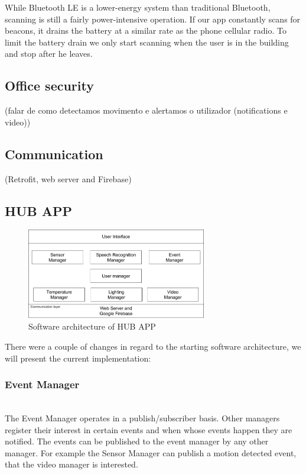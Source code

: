 While Bluetooth LE is a lower-energy system than traditional Bluetooth, scanning is still a fairly power-intensive operation. If our app constantly scans for beacons, it drains the battery at a similar rate as the phone cellular radio. To limit the battery drain we only start scanning when the user is in the building and stop after he leaves.


\subsection{Office security}
(falar de como detectamos movimento e alertamos o utilizador (notifications e video))


\subsection{Communication}
(Retrofit, web server and Firebase)


\subsection{HUB APP}

\begin{figure}[h]
\centering
\includegraphics[width=0.7\textwidth]{Figures/software_implementation}
\caption{Software architecture of HUB APP}
\label{software_imp}
\end{figure}

There were a couple of changes in regard to the starting software architecture, we will present the current implementation:

\subsubsection{Event Manager}\mbox{}\\

The Event Manager  operates in a publish/subscriber basis. Other managers register their interest in certain events and when whose events happen they are notified. The events can be published to the event manager by any other manager. For example the Sensor Manager can publish a motion detected event, that the video manager is interested.

